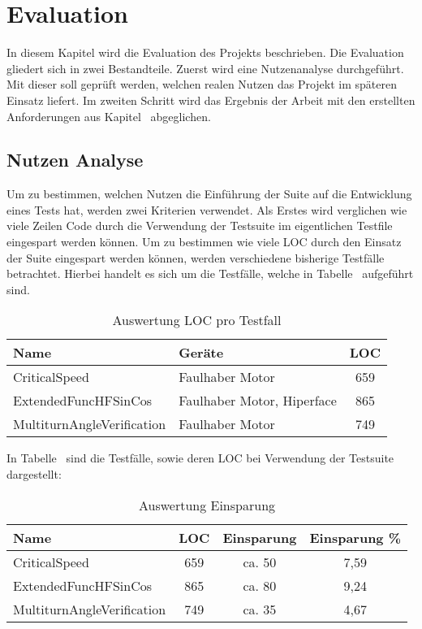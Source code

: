 \onehalfspacing
\section{Evaluation}
In diesem Kapitel wird die Evaluation des Projekts beschrieben. Die Evaluation gliedert sich in zwei Bestandteile. Zuerst wird eine Nutzenanalyse durchgeführt. Mit dieser soll geprüft werden, welchen realen Nutzen das Projekt im späteren Einsatz liefert. Im zweiten Schritt wird das Ergebnis der Arbeit mit den erstellten Anforderungen aus Kapitel \dq {}\dq~abgeglichen. 
	\subsection{Nutzen Analyse}
	Um zu bestimmen, welchen Nutzen die Einführung der Suite auf die Entwicklung eines Tests hat, werden zwei Kriterien verwendet. Als Erstes wird verglichen wie viele Zeilen Code durch die Verwendung der Testsuite im eigentlichen Testfile eingespart werden können. 
	Um zu bestimmen wie viele \ac{LOC} durch den Einsatz der Suite eingespart werden können, werden verschiedene bisherige Testfälle betrachtet. Hierbei handelt es sich um die Testfälle, welche in Tabelle \dq {}\dq~aufgeführt sind. 
	
\begin{table}[h]
\begin{center}
\begin{tabularx}{\textwidth}{|X|X|c|}
\hline
Name & Geräte & \ac{LOC} \\
\hline
CriticalSpeed & Faulhaber Motor & 659 \\
\hline
ExtendedFuncHFSinCos & Faulhaber Motor, Hiperface & 865 \\
\hline
MultiturnAngleVerification & Faulhaber Motor & 749 \\
\hline
\end{tabularx}
\end{center}
\caption{Auswertung \ac{LOC} pro Testfall \label{tab:LOCTestfall}}
\end{table}
In Tabelle \dq {}\dq~sind die Testfälle, sowie deren \ac{LOC} bei Verwendung der Testsuite dargestellt:\newline
\begin{table}[h]
\begin{center}
\begin{tabularx}{\textwidth}{|X|c|c|c|}
\hline
Name & \ac{LOC} & Einsparung & Einsparung \% \\
\hline
CriticalSpeed & 659 & ca. 50 & 7,59 \\
\hline
ExtendedFuncHFSinCos & 865 & ca. 80 & 9,24 \\
\hline
MultiturnAngleVerification & 749 & ca. 35 & 4,67 \\
\hline
\end{tabularx}
\end{center}
\caption{Auswertung Einsparung \label{tab:einsparung}}
\end{table}

